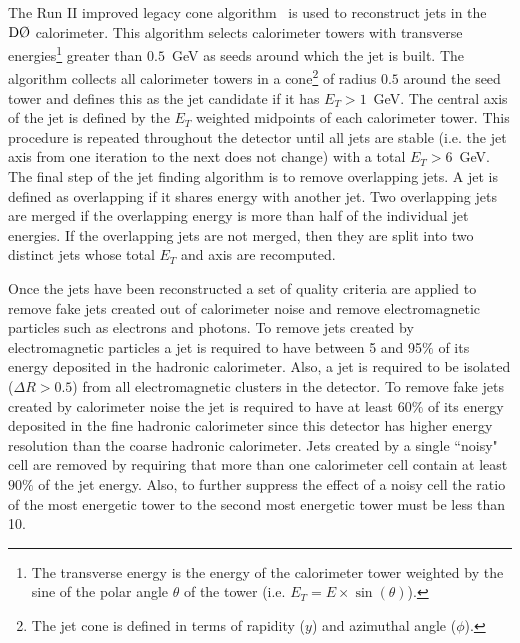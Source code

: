 The Run II improved legacy cone algorithm~\cite{Blazey:2000qt} is used to reconstruct jets in the $\dzero$ calorimeter. This algorithm selects calorimeter towers with transverse energies\footnote{The transverse energy is the energy of the calorimeter tower weighted by the sine of the polar angle $\theta$ of the tower (i.e. $E_{T} = E \times \sin(\theta)$).} greater than $0.5$~GeV as seeds around which the jet is built. The algorithm collects all calorimeter towers in a cone\footnote{The jet cone is defined in terms of rapidity ($y$) and azimuthal angle ($\phi$).} of radius $0.5$ around the seed tower and defines this as the jet candidate if it has $E_{T}>1$~GeV. The central axis of the jet is defined by the $E_{T}$ weighted midpoints of each calorimeter tower. This procedure is repeated throughout the detector until all jets are stable (i.e. the jet axis from one iteration to the next does not change) with a total $E_{T}>6$~GeV. The final step of the jet finding algorithm is to remove overlapping jets. A jet is defined as overlapping if it shares energy with another jet. Two overlapping jets are merged if the overlapping energy is more than half of the individual jet energies. If the overlapping jets are not merged, then they are split into two distinct jets whose total $E_{T}$ and axis are recomputed.


Once the jets have been reconstructed a set of quality criteria are applied to remove fake jets created out of calorimeter noise and remove electromagnetic particles such as electrons and photons. To remove jets created by electromagnetic particles a jet is required to have between 5 and 95$\%$ of its energy deposited in the hadronic calorimeter. Also, a jet is required to be isolated ($\Delta R>0.5$) from all electromagnetic clusters in the detector. To remove fake jets created by calorimeter noise the jet is required to have at least 60$\%$ of its energy deposited in the fine hadronic calorimeter since this detector has higher energy resolution than the coarse hadronic calorimeter. Jets created by a single ``noisy" cell are removed by requiring that more than one calorimeter cell contain at least $90\%$ of the jet energy. Also, to further suppress the effect of a noisy cell the ratio of the most energetic tower to the second most energetic tower must be less than 10.

